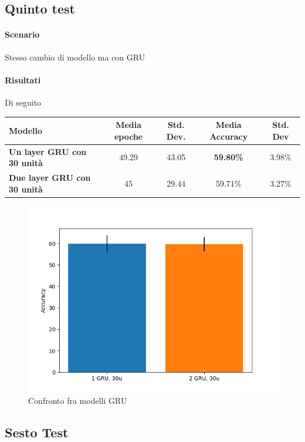 \documentclass[11pt, a4paper, twoside, openright]{book}
\begin{document}
\subsection{Quinto test}
\paragraph{Scenario} Stesso cambio di modello ma con GRU
\paragraph{Risultati} Di seguito\\
\begin{tabular}{l|c|c|c|c}
    \textbf{Modello} & \textbf{Media epoche} & \textbf{Std. Dev.} & \textbf{Media Accuracy} & \textbf{Std. Dev} \\
    \hline 
    \textbf{Un layer GRU con 30 unità} & 49.29 & 43.05 & \textbf{59.80\%} & 3.98\% \\
    \textbf{Due layer GRU con 30 unità} & 45 & 29.44 & 59.71\% & 3.27\%\\
\end{tabular}
\begin{figure}
    \centering
    \includegraphics[scale=0.75]{img/fifth.png}
    \caption{Confronto fra modelli GRU}
    \label{fig:fifth}
\end{figure}
\subsection{Sesto Test}
\end{document}
